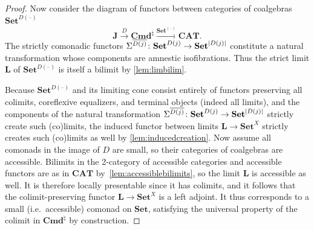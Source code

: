 \documentclass[11pt, oneside, article]{memoir}
\theoremstyle{plain}
\theoremstyle{definition}
\theoremstyle{remark}
\DeclarePairedDelimiter{\abs}{\lvert}{\rvert}
\newcommand{\dash}{{\mathord{\text{--}}}}
\newcommand{\xto}[1]{\xrightarrow{#1}}
\newcommand{\namedcat}[1]{\mathbf{#1}}
\newcommand{\cat}[1]{\mathbf{#1}}
\newcommand{\Set}{\namedcat{Set}}
\newcommand{\CAT}{\namedcat{CAT}}
\newcommand{\Con}{\namedcat{Cmd}^\natural}
\newcommand{\ConO}{\Con}
\newcommand{\ConOSet}{\ConO}
\newcommand{\clift}[1]{\overline{#1}}
\newcommand{\pts}[1]{{\abs{#1}}}
\newcommand{\carr}{\Sigma}
\newcommand{\car}[1]{\carr^{#1}}
\newcommand{\xX}{X}
\newcommand{\bJ}{\cat{J}}
\newcommand{\bL}{\cat{L}}
\begin{document}
\begin{proof}
  Now consider the diagram of functors between categories of
  coalgebras $\Set^{D(\dash)}$
  \[\bJ \xto{D} \ConOSet \xto{\Set^{(\dash)}} \CAT.\] The strictly
  comonadic functors
  $\car{\clift{D(j)}} \colon \Set^{D(j)} \to \Set^{\pts{D(j)}}$
  constitute a natural transformation whose components are amnestic
  isofibrations. Thus the strict limit $\bL$ of $\Set^{D(\dash)}$ is
  itself a bilimit by \cref{lem:limbilim}.


  Because $\Set^{D(\dash)}$ and its limiting cone consist entirely of
  functors preserving all colimits, coreflexive equalizers, and
  terminal objects (indeed all limits), and the components of the
  natural transformation
  $\car{\clift{D(j)}} \colon \Set^{D(j)} \to \Set^{\pts{D(j)}}$
  strictly create such (co)limits, the induced functor between limits
  $\bL \to \Set^\xX$ strictly creates such (co)limits as well by
  \cref{lem:inducedcreation}. Now assume all comonads in
  the image of $D$ are small, so their categories of coalgebras are
  accessible. Bilimits in the 2-category of accessible categories and
  accessible functors are as in $\CAT$
  by~\cref{lem:accessiblebilimits}, so the limit $\bL$ is accessible
  as well. It is therefore locally presentable since it has colimits,
  and it follows that the colimit-preserving functor
  $\bL \to \Set^\xX$ is a left adjoint. It thus corresponds to a small
  (i.e.\ accessible) comonad on $\Set$, satisfying the universal
  property of the colimit in $\ConOSet$ by construction.
\end{proof}
\end{document}
